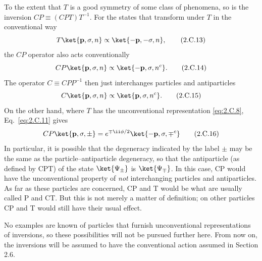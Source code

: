 To the extent that $T$ is a good symmetry of some class of phenomena, so is
the inversion $CP\equiv(CPT)T^{-1}$. For the states that transform under $T$
in the conventional way
\begin{equation}
  T\ket{\mathbf{p},\sigma,n}
    \propto\ket{-\mathbf{p},-\sigma,n},
  \tag{2.C.13}\label{eq:2.C.13}
\end{equation}
the $CP$ operator also acts conventionally
\begin{equation}
  CP\ket{\mathbf{p},\sigma,n}
    \propto\ket{-\mathbf{p},\sigma,n^c}.
  \tag{2.C.14}\label{eq:2.C.14}
\end{equation}
The operator $C\equiv CPP^{-1}$ then just interchanges particles and
antiparticles
\begin{equation}
  C\ket{\mathbf{p},\sigma,n}
    \propto\ket{\mathbf{p},\sigma,n^c}.
  \tag{2.C.15}\label{eq:2.C.15}
\end{equation}
On the other hand, where $T$ has the unconventional representation \eqref{eq:2.C.8},
Eq.~\eqref{eq:2.C.11} gives
\begin{equation}
  CP\ket{\mathbf{p},\sigma,\pm}
    =e^{\mp \ii\phi/2}\ket{-\mathbf{p},\sigma,\mp^c}
  \tag{2.C.16}\label{eq:2.C.16}
\end{equation}
In particular, it is possible that the degeneracy indicated by the label
$\pm$ may be the same as the particle--antiparticle degeneracy, so that the
antiparticle (as defined by CPT) of the state $\ket{\Psi_\pm}$ is
$\ket{\Psi_\mp}$. In this case, CP would have the unconventional property of
\emph{not} interchanging particles and antiparticles. As far as these
particles are concerned, CP and T would be what are usually called P and CT.
But this is not merely a matter of definition; on other particles CP and T
would still have their usual effect.

No examples are known of particles that furnish unconventional
representations of inversions, so these possibilities will not be pursued
further here. From now on, the inversions will be assumed to have the
conventional action assumed in Section 2.6.


